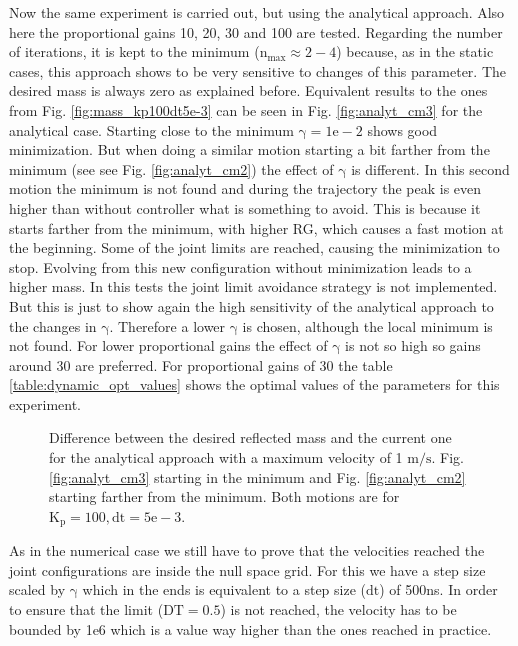 Now the same experiment is carried out, but using the analytical approach.
Also here the proportional gains 10, 20, 30 and 100 are tested.  Regarding the number of iterations, it is kept to the minimum ($\mathrm{n_{max} \approx 2-4}$) because, as in the static cases, this approach shows to be very sensitive to changes of this parameter.
The desired mass is always zero as explained before.  Equivalent results to the ones from  Fig. \ref{fig:mass_kp100dt5e-3} can be seen in Fig. \ref{fig:analyt_cm3} for the analytical case. Starting close to the minimum $\mathrm{\gamma = 1e-2}$ shows good minimization. But when doing a similar motion starting a bit farther from the minimum (see see Fig. \ref{fig:analyt_cm2}) the effect of $\mathrm{\gamma}$ is different. In this second motion the minimum is not found and during the trajectory the peak is even higher than without controller what is something to avoid. This is because it starts farther from the minimum, with higher RG, which causes a fast motion at the beginning. Some of the joint limits are reached, causing the minimization to stop. Evolving from this new configuration without minimization leads to a higher mass. In this tests the joint limit avoidance strategy is not implemented. But this is just to show again the high sensitivity of the analytical approach to the changes in $\mathrm{\gamma}$.
Therefore a lower $\mathrm{\gamma}$ is chosen, although the local minimum is not found. 
For lower proportional gains the effect of $\mathrm{\gamma}$ is not so high so gains around 30 are preferred.
For proportional gains of 30 the table \ref{table:dynamic_opt_values} shows the optimal values of the parameters for this experiment. \\
%
%
\begin{figure}[!htp!]
	\centering	
	 	 	 	
	\caption{Difference between the desired reflected mass and the current one for the analytical approach with a maximum velocity of 1 $\mathrm{m/s}$.   Fig. \ref{fig:analyt_cm3} starting in the minimum and
 	  Fig. \ref{fig:analyt_cm2} starting farther from the minimum. Both motions are for $\mathrm{K_p = 100, dt=5e-3}$.}
	\label{fig:analyt_cm2and3}
\end{figure}
%
As in the numerical case we still have to prove that the velocities reached the joint configurations are inside the null space grid. For this we have a step size scaled by $\mathrm{\gamma}$ which in the ends is equivalent to a step size ($\mathrm{dt}$) of 500ns. In order to ensure that the limit ($\mathrm{DT=0.5}$) is not reached, the velocity has to be bounded by 1e6 which is a value way higher than the ones reached in practice.


